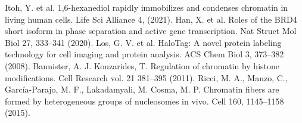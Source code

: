 \documentclass{ucetd}
\begin{document}
\noindent [25] Itoh, Y. et al. 1,6-hexanediol rapidly immobilizes and condenses chromatin in living human cells. Life Sci Alliance 4, (2021). 
\newline
\noindent [26] Han, X. et al. Roles of the BRD4 short isoform in phase separation and active gene transcription. Nat Struct Mol Biol 27, 333–341 (2020). 
\newline
\noindent [27] Los, G. V. et al. HaloTag: A novel protein labeling technology for cell imaging and protein analysis. ACS Chem Biol 3, 373–382 (2008). 
\newline
\noindent [28] Bannister, A. J. Kouzarides, T. Regulation of chromatin by histone modifications. Cell Research vol. 21 381–395 (2011). 
\newline
\noindent [29] Ricci, M. A., Manzo, C., García-Parajo, M. F., Lakadamyali, M. Cosma, M. P. Chromatin fibers are formed by heterogeneous groups of nucleosomes in vivo. Cell 160, 1145–1158 (2015). 
\newline
\end{document}
